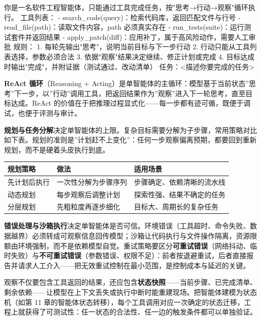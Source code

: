 \documentclass[
]{ctexbook}
\newenvironment{Shaded}{
  \ttfamily\small
}{}
\newcommand{\NormalTok}[1]{#1}
\newcounter{none}
\begin{document}
\begin{Shaded}
\begin{Highlighting}[]
\NormalTok{你是一名软件工程智能体，只能通过工具完成任务，按"思考→行动→观察"循环执行。}
\NormalTok{工具列表：}
\NormalTok{{-} search\_code(query)：检索代码库，返回匹配文件与行号}
\NormalTok{{-} read\_file(path)：读取文件内容，path 必须真实存在}
\NormalTok{{-} run\_tests(suite)：运行测试套件并返回结果}
\NormalTok{{-} apply\_patch(diff)：应用补丁，属于高风险动作，需要人工审批}
\NormalTok{规则：}
\NormalTok{1. 每轮先输出"思考"，说明当前目标与下一步行动}
\NormalTok{2. 行动只能从工具列表选择，参数必须合法}
\NormalTok{3. 依据"观察"结果决定继续、修正计划或完成}
\NormalTok{4. 目标达成时输出"完成"，并附证据（测试通过、改动清单）}
\NormalTok{任务：\textless{}描述你要完成的任务\textgreater{}}
\end{Highlighting}
\end{Shaded}

\textbf{ReAct 循环}（Reasoning +
Acting）是单智能体的主循环：模型基于当前状态''思考''下一步，以''行动''调用工具，把返回结果作为''观察''进入下一轮思考，直至目标达成。ReAct
的价值在于把推理过程显式化------每一步都有迹可循，既便于调试，也便于评测与审计。

\textbf{规划与任务分解}决定单智能体的上限。复杂目标需要分解为子步骤，常用策略对比如下表。规划的准则是''计划赶不上变化''：任何一步观察偏离预期，都要回到重新规划，而不是硬着头皮执行到底。

{\def\LTcaptype{none} %
\begin{longtable}[]{@{}lll@{}}
\toprule\noalign{}
规划策略 & 做法 & 适用场景 \\
\midrule\noalign{}
\endhead
\bottomrule\noalign{}
\endlastfoot
先计划后执行 & 一次性分解为步骤序列 & 步骤确定、依赖清晰的流水线 \\
动态规划 & 每步观察后调整计划 & 探索性强、结果不确定的任务 \\
分层规划 & 先粗粒度再逐步细化 & 目标大、周期长的复杂任务 \\
\end{longtable}
}

\textbf{错误处理与沙箱执行}决定单智能体是否可信。环境错误（工具超时、命令失败、数据越界）必须转成可观察信息回传模型；沙箱让代码执行与文件操作隔离，资源限额由环境强制，而不是依赖模型自觉。重试策略要区分\textbf{可重试错误}（网络抖动、临时失败）与\textbf{不可重试错误}（参数错误、权限不足）：前者按退避重试，后者直接报告并请求人工介入------把无效重试控制在最小范围，是控制成本与延迟的关键。

观察不仅要包含工具返回的结果，还应包含\textbf{状态快照}------当前步骤、已完成清单、剩余依赖------让模型在上下文丢失或执行中断时能重建现场。把智能体建模为状态机（如第
11
章的智能体状态转移），每个工具调用对应一次确定的状态迁移，工程上就获得了可测试性：任一状态的合法性、任一边的触发条件都可以单独验证。
\end{document}
